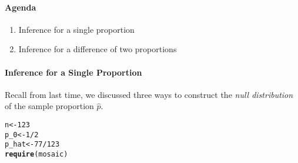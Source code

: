 \documentclass[10pt]{article}\usepackage[]{graphicx}\usepackage[]{color}
\makeatletter
\newcommand{\hlnum}[1]{\textcolor[rgb]{0.686,0.059,0.569}{#1}}%
\newcommand{\hlopt}[1]{\textcolor[rgb]{0,0,0}{#1}}%
\newcommand{\hlstd}[1]{\textcolor[rgb]{0.345,0.345,0.345}{#1}}%
\newcommand{\hlkwb}[1]{\textcolor[rgb]{0.69,0.353,0.396}{#1}}%
\newcommand{\hlkwd}[1]{\textcolor[rgb]{0.737,0.353,0.396}{\textbf{#1}}}%
\newenvironment{kframe}{%
 \def\at@end@of@kframe{}%
 \ifinner\ifhmode%
  \def\at@end@of@kframe{\end{minipage}}%
  \begin{minipage}{\columnwidth}%
 \fi\fi%
 \def\FrameCommand##1{\hskip\@totalleftmargin \hskip-\fboxsep
 \colorbox{shadecolor}{##1}\hskip-\fboxsep
     \hskip-\linewidth \hskip-\@totalleftmargin \hskip\columnwidth}%
 \MakeFramed {\advance\hsize-\width
   \@totalleftmargin\z@ \linewidth\hsize
   \@setminipage}}%
 {\par\unskip\endMakeFramed%
 \at@end@of@kframe}
\newenvironment{knitrout}{}{} %
\makeatother
\begin{document}
\paragraph{Agenda}
\begin{enumerate}
  \itemsep0em
  \item Inference for a single proportion
  \item Inference for a difference of two proportions
\end{enumerate}

\paragraph{Inference for a Single Proportion}

Recall from last time, we discussed three ways to construct the \emph{null distribution} of the sample proportion $\hat{p}$.

\begin{knitrout}
\color{fgcolor}\begin{kframe}
\begin{alltt}
\hlstd{n} \hlkwb{<-} \hlnum{123}
\hlstd{p_0} \hlkwb{<-} \hlnum{1}\hlopt{/}\hlnum{2}
\hlstd{p_hat} \hlkwb{<-} \hlnum{77}\hlopt{/}\hlnum{123}
\hlkwd{require}\hlstd{(mosaic)}
\end{alltt}
\end{kframe}
\end{knitrout}
\end{document}
